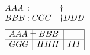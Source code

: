 \documentclass{article}
\begin{document}
\[\begin{array}{l@{\;:\;}l@{\quad\dagger}r}\lefteqn{AAA}&&\\ BBB&CCC&DDD\end{array}\]
\[\begin{array}{|l|c|r|}\hline
\lefteqn{AAA = BBB} & & \\ \hline
GGG & HHH & III \\ \hline
\end{array}\]
\end{document}
